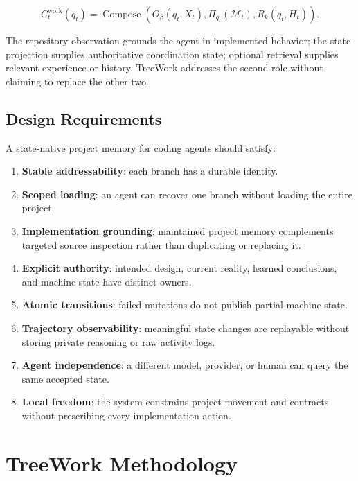 \documentclass[11pt]{article}
\newcommand{\M}{\mathcal{M}}
\theoremstyle{definition}
\begin{document}
\begin{equation}
  C_t^{\mathrm{work}}(q_t)
  =
  \operatorname{Compose}\!\left(
    O_\beta(q_t,X_t),
    \Pi_{q_t}(\M_t),
    R_k(q_t,H_t)
  \right).
  \label{eq:composed-work-context}
\end{equation}

The repository observation grounds the agent in implemented behavior; the state
projection supplies authoritative coordination state; optional retrieval
supplies relevant experience or history.  TreeWork addresses the second role
without claiming to replace the other two.

\subsection{Design Requirements}

A state-native project memory for coding agents should satisfy:

\begin{enumerate}
  \item \textbf{Stable addressability}: each branch has a durable identity.
  \item \textbf{Scoped loading}: an agent can recover one branch without
        loading the entire project.
  \item \textbf{Implementation grounding}: maintained project memory complements
        targeted source inspection rather than duplicating or replacing it.
  \item \textbf{Explicit authority}: intended design, current reality, learned
        conclusions, and machine state have distinct owners.
  \item \textbf{Atomic transitions}: failed mutations do not publish partial
        machine state.
  \item \textbf{Trajectory observability}: meaningful state changes are
        replayable without storing private reasoning or raw activity logs.
  \item \textbf{Agent independence}: a different model, provider, or human can
        query the same accepted state.
  \item \textbf{Local freedom}: the system constrains project movement and
        contracts without prescribing every implementation action.
\end{enumerate}

\section{TreeWork Methodology}
\label{sec:method}
\end{document}
